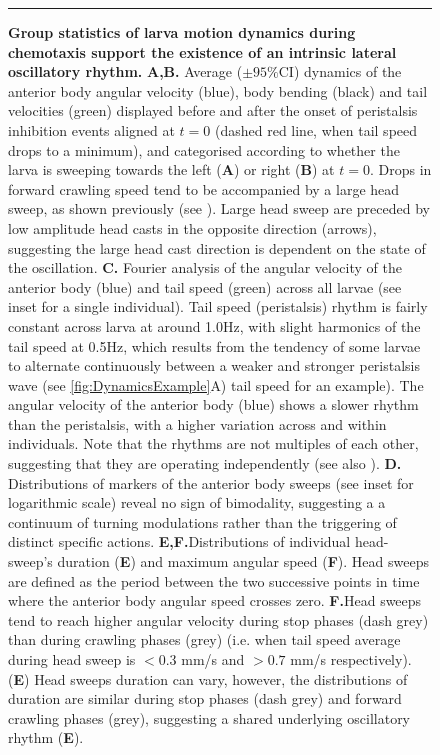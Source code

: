 \documentclass[11pt,a4paper]{article}
\begin{document}
\begin{figure}[ht!]
\begin{center}
\caption{{\bf Group statistics of larva motion dynamics during chemotaxis support the existence of an intrinsic lateral oscillatory rhythm.}
{\bf A,B.} Average ($\pm 95\%$CI) dynamics of the anterior body angular velocity (blue), body bending (black) and tail velocities (green) displayed before and after the onset of peristalsis inhibition events aligned at $t=0$ (dashed red line, when tail speed drops to a minimum), and categorised according to whether the larva is sweeping towards the left ({\bf A}) or right ({\bf B}) at $t=0$. Drops in forward crawling speed tend to be accompanied by a large head sweep, as shown previously \citep{hernandez2015reverse} (see ). Large head sweep are preceded by low amplitude head casts in the opposite direction (arrows), suggesting the large head cast direction is dependent on the state of the oscillation. %
{\bf C.} Fourier analysis of the angular velocity of the anterior body (blue) and tail speed (green) across all larvae (see inset for a single individual). Tail speed (peristalsis) rhythm is fairly constant across larva at around 1.0Hz, with slight harmonics of the tail speed at 0.5Hz, which results from the tendency of some larvae to alternate continuously between a weaker and stronger peristalsis wave (see \ref{fig:DynamicsExample}A) tail speed for an example). The angular velocity of the anterior body (blue) shows a slower rhythm than the peristalsis, with a higher variation across and within individuals. Note that the rhythms are not multiples of each other, suggesting that they are operating independently (see also ).
 {\bf D.} Distributions of markers of the anterior body sweeps (see inset for logarithmic scale) reveal no sign of bimodality, suggesting a a continuum of turning modulations rather than the triggering of distinct specific actions. {\bf E,F.}Distributions of individual head-sweep’s duration ({\bf E}) and maximum angular speed ({\bf F}). Head sweeps are defined as the period between the two successive points in time where the anterior body angular speed crosses zero. {\bf F.}Head sweeps tend to reach higher angular velocity during stop phases (dash grey) than during crawling phases (grey) (i.e. when tail speed average during head sweep is $<0.3$ mm/s and $>0.7$ mm/s respectively). ({\bf E}) Head sweeps duration can vary, however, the distributions of duration are similar during stop phases (dash grey) and forward crawling phases (grey), suggesting a shared underlying oscillatory rhythm ({\bf E}). 
\label{fig:GroupAnalysis}
}
\hrule
\end{center}
\end{figure}
\end{document}
